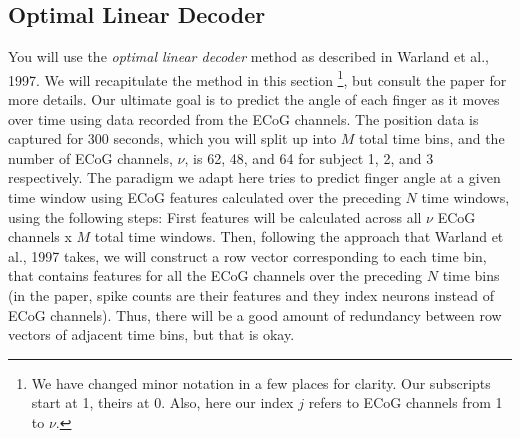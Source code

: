 \documentclass{article}
\begin{document}
\subsection*{Optimal Linear Decoder}
You will use the \emph{optimal linear decoder} method as described in Warland et al., 1997. We will recapitulate the method in this section \footnote{We have changed minor notation in a few places for clarity. Our subscripts start at 1, theirs at 0. Also, here our index $j$ refers to ECoG channels from 1 to $\nu$.}, but consult the paper for more details. Our ultimate goal is to predict the angle of each finger as it moves over time using data recorded from the ECoG channels. The position data is captured for 300 seconds, which you will split up into $M$ total time bins, and the number of ECoG channels, $\nu$, is 62, 48, and 64 for subject 1, 2, and 3 respectively. The paradigm we adapt here tries to predict finger angle at a given time window using ECoG features calculated over the preceding $N$ time windows, using the following steps: First features will be calculated across all $\nu$ ECoG channels x $M$ total time windows. Then, following the approach that Warland et al., 1997 takes, we will construct a row vector corresponding to each time bin, that contains features for all the ECoG channels over the preceding $N$ time bins (in the paper, spike counts are their features and they index neurons instead of ECoG channels). Thus, there will be a good amount of redundancy between row vectors of adjacent time bins, but that is okay.
\end{document}
